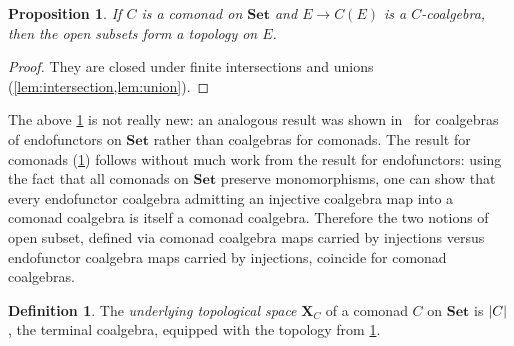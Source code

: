 \documentclass[11pt, oneside, article]{memoir}
\theoremstyle{plain}
\newtheorem{corollary}[theorem]{Corollary}
\newtheorem{proposition}[theorem]{Proposition}
\theoremstyle{definition}
\newtheorem{definition}[def]{Definition}
\theoremstyle{remark}
\newenvironment{remark}
{\renewcommand\qedsymbol{$\lrcorner$}%
  \pushQED{\qed}\myremark}
{\popQED\endmyremark}
\DeclarePairedDelimiter{\abs}{\lvert}{\rvert}
\newcommand{\namedcat}[1]{\mathbf{#1}}
\newcommand{\spa}[1]{\mathbf{#1}}
\newcommand{\Set}{\namedcat{Set}}
\newcommand{\pts}[1]{{\abs{#1}}}
\newcommand{\cmnd}[1]{{#1}}
\newcommand{\eE}{E}
\newcommand{\cC}{\cmnd{C}}
\newcommand{\tX}{\spa{X}}
\newcommand{\cmdtotop}[1]{{\tX_{#1}}}
\begin{document}
\begin{proposition}\label{prop:topology}
  If $\cC$ is a comonad on $\Set$ and $\eE\to\cC(\eE)$ is a
  $\cC$-coalgebra, then the open subsets form a topology on $\eE$.
\end{proposition}
\begin{proof}
  They are closed under finite intersections and
  unions (\cref{lem:intersection,lem:union}).
\end{proof}


\begin{remark}
  The above \cref{prop:topology} is not really new: an analogous
  result was shown in~\cite{gumm-schroder:bounded} for coalgebras of
  endofunctors on $\Set$ rather than coalgebras for comonads. The
  result for comonads (\cref{prop:topology}) follows without much work
  from the result for endofunctors: using the fact that all comonads
  on $\Set$ preserve monomorphisms, one can show that every
  endofunctor coalgebra admitting an injective coalgebra map into a
  comonad coalgebra is itself a comonad coalgebra. Therefore the two
  notions of open subset, defined via comonad coalgebra maps carried
  by injections versus endofunctor coalgebra maps carried by
  injections, coincide for comonad coalgebras.
\end{remark}

\begin{definition}\label{def:underlyingspace}
  The \emph{underlying topological space} $\cmdtotop{\cC}$ of a
  comonad $\cC$ on $\Set$ is $\pts{\cC}$, the terminal coalgebra,
  equipped with the topology from \cref{prop:topology}.

\end{definition}
\end{document}

